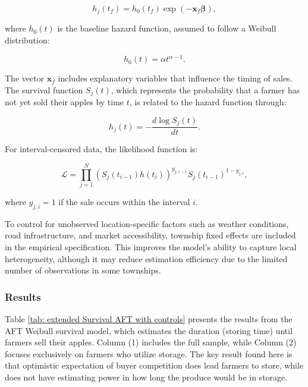 \begin{equation}
    h_j(t_{f}) = h_0(t_{f}) \exp\left(-\mathbf{x}_{f} \boldsymbol{\beta}\right),
\end{equation}

where $h_0(t)$ is the baseline hazard function, assumed to follow a Weibull distribution:

\begin{equation}
    h_0(t) = \alpha t^{\alpha-1}.
\end{equation}

The vector $\mathbf{x}_{f}$ includes explanatory variables that influence the timing of sales. The survival function $S_j(t)$, which represents the probability that a farmer has not yet sold their apples by time $t$, is related to the hazard function through:

\begin{equation}
    h_j(t) = -\frac{d \log S_j(t)}{dt}.
\end{equation}

For interval-censored data, the likelihood function is:

\begin{equation}
    \mathcal{L} = \prod_{j=1}^N \left(S_j(t_{i-1}) h(t_i)\right)^{y_{j,i-1}} S_j(t_{i-1})^{1-y_{j,i}},
\end{equation}

where $y_{j,i} = 1$ if the sale occurs within the interval $i$.

To control for unobserved location-specific factors such as weather conditions, road infrastructure, and market accessibility, township fixed effects are included in the empirical specification. This improves the model's ability to capture local heterogeneity, although it may reduce estimation efficiency due to the limited number of observations in some townships.



\subsubsection{Results}
\noindent 
Table \ref{tab: extended Survival AFT with controls} presents the results from the AFT Weibull survival model, which estimates the duration (storing time) until farmers sell their apples. Column (1) includes the full sample, while Column (2) focuses exclusively on farmers who utilize storage. The key result found here is that optimistic expectation of buyer competition does lead farmers to store, while does not have estimating power in how long the produce would be in storage.

